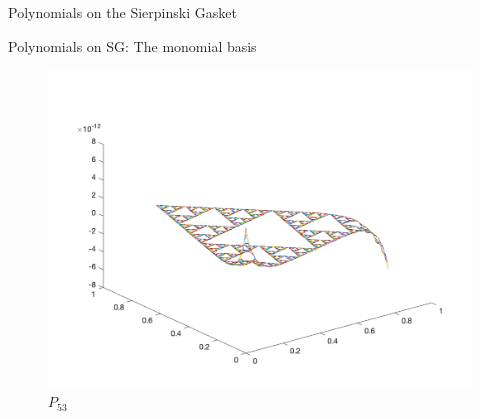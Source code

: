 \documentclass[xcolor = dvipsnames]{beamer}
\begin{document}
\begin{section}{Polynomials on the Sierpinski Gasket}
\begin{frame}{Polynomials on SG: The monomial basis}
    \begin{figure}[H]
        \centering
        \includegraphics[width=0.75\linewidth]{Final_presentation/monomial5_3.png}
        \caption{$P_{53}$}
    \end{figure}
\end{frame}
\end{section}
\end{document}
